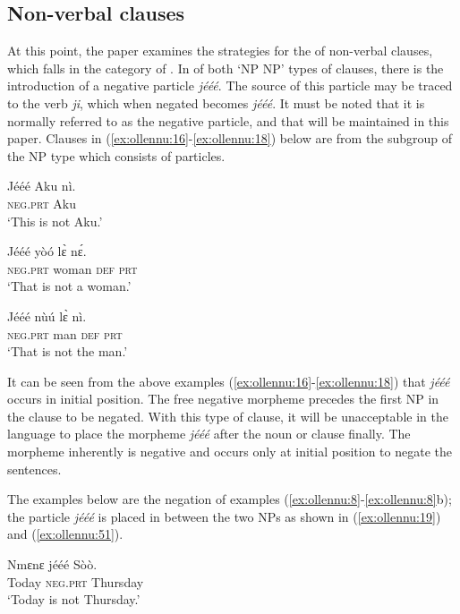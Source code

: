 \documentclass[output=paper,newtxmath,modfonts,nonflat,hidelinks]{langsci/langscibook}
\begin{document}
\subsection{\label{sec:ollennu:2.1} Non-verbal clauses}

At this point, the paper examines the strategies for the  of non-verbal clauses, which falls in the category of . In  of both ‘NP NP’ types of clauses, there is the introduction of a {negative particle} \textit{jééé}. The source of this particle may be traced to the  verb \textit{ji}, which when negated becomes \textit{jééé}. It must be noted that it is normally referred to as the {negative particle}, and that will be maintained in this paper. Clauses in (\ref{ex:ollennu:16}-\ref{ex:ollennu:18}) below are from the subgroup of the NP type which consists of particles.

\ea \label{ex:ollennu:16}
\gll Jééé Aku nì.\\
\textsc{neg}.\textsc{prt} Aku\\
\glt `This is not Aku.'
\z

\ea \label{ex:ollennu:17}
\gll Jééé yòó l\`ɛ n\'ɛ.\\
\textsc{neg}.\textsc{prt} woman \textsc{def} \textsc{prt}\\
\glt `That is not a woman.'
\z

\ea \label{ex:ollennu:18}
\gll Jééé nù\'u l\`ɛ nì.\\
\textsc{neg}.\textsc{prt} man \textsc{def} \textsc{prt}\\
\glt ‘That is not the man.’
\z

It can be seen from the above examples (\ref{ex:ollennu:16}-\ref{ex:ollennu:18}) that \textit{jééé} occurs in initial position. The free negative morpheme precedes the first NP in the clause to be negated. With this type of clause, it will be unacceptable in the  language to place the morpheme \textit{jééé} after the noun or clause finally. The morpheme inherently is negative and occurs only at initial position to negate the sentences. 

The examples below are the negation of examples (\ref{ex:ollennu:8}-\ref{ex:ollennu:8}b); the particle \textit{jééé} is placed in between the two NPs as shown in (\ref{ex:ollennu:19}) and (\ref{ex:ollennu:51}).

\ea \label{ex:ollennu:19}
\gll Nmɛnɛ jééé Sòò.\\
Today \textsc{neg}.\textsc{prt} Thursday\\
\glt `Today is not Thursday.'
\z
\end{document}
